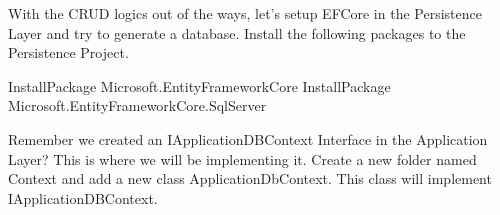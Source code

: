 \documentclass[letterpaper,10pt,english]{sphinxmanual}
\begin{document}
\begin{sphinxVerbatim}[commandchars=\\\{\}]
       
\end{sphinxVerbatim}

With the CRUD logics out of the ways, let’s setup EFCore in the Persistence Layer and try to generate a database. Install the following packages to the Persistence Project.

\begin{sphinxVerbatim}[commandchars=\\\{\}]
Install\PYGZhy{}Package Microsoft.EntityFrameworkCore
Install\PYGZhy{}Package Microsoft.EntityFrameworkCore.SqlServer
\end{sphinxVerbatim}

Remember we created an IApplicationDBContext Interface in the Application Layer? This is where we will be implementing it. Create a new folder named Context and add a new class ApplicationDbContext. This class will implement IApplicationDBContext.

\begin{sphinxVerbatim}[commandchars=\\\{\}]
     
      
         
          
       
          
\end{sphinxVerbatim}
\end{document}
